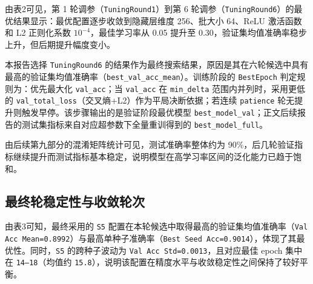 \documentclass[11pt]{article}
\begin{document}
\begin{CJK*}{UTF8}{gbsn}
由表2可见，第 1 轮调参（\texttt{TuningRound1}）到第 6 轮调参（\texttt{TuningRound6}）的最优结果显示：最优配置逐步收敛到隐藏层维度 256、批大小 64、ReLU 激活函数和 L2 正则化系数 $10^{-4}$，最佳学习率从 0.05 提升至 0.30，验证集均值准确率稳步上升，但后期提升幅度变小。

本报告选择 \texttt{TuningRound6} 的结果作为最终搜索结果，原因是其在六轮候选中具有最高的验证集均值准确率（\texttt{best\_val\_acc\_mean}）。训练阶段的 \texttt{BestEpoch} 判定规则为：优先最大化 \texttt{val\_acc}；当 \texttt{val\_acc} 在 \texttt{min\_delta} 范围内并列时，采用更低的 \texttt{val\_total\_loss}（交叉熵+L2）作为平局决断依据；若连续 \texttt{patience} 轮无提升则触发早停。该步骤输出的是验证阶段最优模型 \texttt{best\_model\_val}；正文后续报告的测试集指标来自对应超参数下全量重训得到的 \texttt{best\_model\_full}。

由后续第九部分的混淆矩阵统计可见，测试准确率整体约为 90\%，后几轮验证指标继续提升而测试指标基本稳定，说明模型在高学习率区间的泛化能力已趋于饱和。

\subsection{最终轮稳定性与收敛轮次}
\begin{table}[H]
\centering
\small
\setlength{\tabcolsep}{4pt}
\normalsize
\caption{最终轮多种子稳定性。其中，\texttt{S1--S5} 分别对应学习率 \texttt{0.24, 0.25, 0.26, 0.28, 0.30}（其余设置一致：隐藏层维度为 256、批大小为 64、激活函数为 ReLU，且 L2 正则化系数为 $10^{-4}$）。}
\label{tab:round6-stability}
\end{table}

由表3可知，最终采用的 \texttt{S5} 配置在本轮候选中取得最高的验证集均值准确率（\texttt{Val Acc Mean=0.8992}）与最高单种子准确率（\texttt{Best Seed Acc=0.9014}），体现了其最优性。同时，\texttt{S5} 的跨种子波动为 \texttt{Val Acc Std=0.0013}，且对应最佳 epoch 集中在 \texttt{14--18}（均值约 \texttt{15.8}），说明该配置在精度水平与收敛稳定性之间保持了较好平衡。


\end{CJK*}
\end{document}
